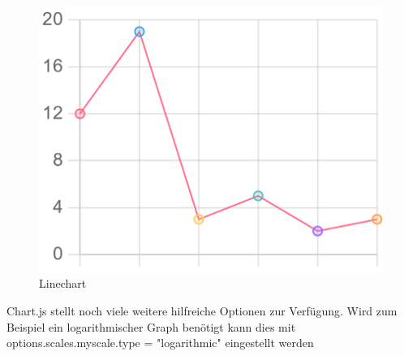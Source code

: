 \begin{figure}[H]
    \centering
    \includegraphics[scale=0.3]{pics/lineChart.png}
    \caption{Linechart}
    \label{fig:tech:linechart}
\end{figure}

Chart.js stellt noch viele weitere hilfreiche Optionen zur Verfügung. Wird
zum Beispiel ein logarithmischer Graph benötigt kann dies mit options.scales.myscale.type = "logarithmic" eingestellt werden

